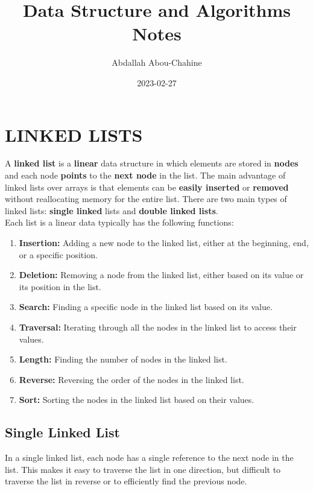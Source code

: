 \documentclass{article}
\title{Data Structure and Algorithms Notes}
\author{Abdallah Abou-Chahine}
\date{2023-02-27}
\begin{document}
\maketitle

\section{LINKED LISTS}
A \textbf{linked list} is a \textbf{linear} data structure in which elements are stored in \textbf{nodes} and each node \textbf{points} to the \textbf{next node} in the list. The main advantage of linked lists over arrays is that elements can be\textbf{ easily inserted} or \textbf{removed} without reallocating memory for the entire list. There are two main types of linked lists: \textbf{single linked} lists and \textbf{double linked lists}.\\

Each list is a linear data typically has the following functions:

\begin{enumerate}[label=\arabic*., wide=0pt, labelwidth=!, labelsep=5pt]

    \item \textbf{Insertion:} Adding a new node to the linked list, either at the beginning, end, or a specific position.

    \item \textbf{Deletion:} Removing a node from the linked list, either based on its value or its position in the list.

    \item \textbf{Search:} Finding a specific node in the linked list based on its value.

    \item \textbf{Traversal:} Iterating through all the nodes in the linked list to access their values.

    \item \textbf{Length:} Finding the number of nodes in the linked list.

    \item \textbf{Reverse:} Reversing the order of the nodes in the linked list.

    \item \textbf{Sort:} Sorting the nodes in the linked list based on their values.

\end{enumerate}
\subsection[short]{Single Linked List}
In a single linked list, each node has a single reference to the next node in the list. This makes it easy to traverse the list in one direction, but difficult to traverse the list in reverse or to efficiently find the previous node.\\
\end{document}

